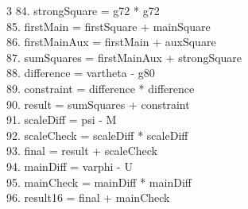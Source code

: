 \documentclass[10pt]{article}
\begin{document}
\begin{multicols}{3}
84. strongSquare = g72 * g72\\
85. firstMain = firstSquare + mainSquare\\
86. firstMainAux = firstMain + auxSquare\\
87. sumSquares = firstMainAux + strongSquare\\
88. difference = vartheta - g80\\
89. constraint = difference * difference\\
90. result = sumSquares + constraint\\
91. scaleDiff = psi - M\\
92. scaleCheck = scaleDiff * scaleDiff\\
93. final = result + scaleCheck\\
94. mainDiff = varphi - U\\
95. mainCheck = mainDiff * mainDiff\\
96. result16 = final + mainCheck\\
\end{multicols}
\end{document}
